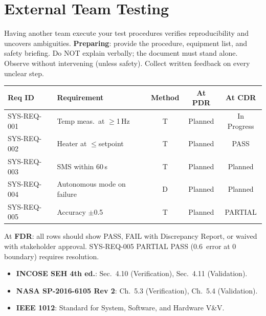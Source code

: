 \section{External Team Testing}
Having another team execute your test procedures verifies reproducibility and uncovers ambiguities. \textbf{Preparing}: provide the procedure, equipment list, and safety briefing. Do NOT explain verbally; the document must stand alone. Observe without intervening (unless safety). Collect written feedback on every unclear step.

\begin{greenshieldbox}
\small
\begin{tabularx}{\linewidth}{l l c c c}
\toprule
\textbf{Req ID} & \textbf{Requirement} & \textbf{Method} & \textbf{At PDR} & \textbf{At CDR} \\
\midrule
SYS-REQ-001 & Temp meas.\ at $\geq$1\,Hz & T & Planned & In Progress \\
SYS-REQ-002 & Heater at $\leq$setpoint & T & Planned & PASS \\
SYS-REQ-003 & SMS within 60\,s & T & Planned & Planned \\
SYS-REQ-004 & Autonomous mode on failure & D & Planned & Planned \\
SYS-REQ-005 & Accuracy $\pm$0.5\,\degC{} & T & Planned & PARTIAL \\
\bottomrule
\end{tabularx}

At \textbf{FDR}: all rows should show PASS, FAIL with Discrepancy Report, or waived with stakeholder approval. SYS-REQ-005 PARTIAL PASS (0.6\,\degC{} error at 0\,\degC{} boundary) requires resolution.
\end{greenshieldbox}

\begin{keyconceptbox}
\begin{itemize}[nosep,leftmargin=1.5em]
\item \textbf{INCOSE SEH 4th ed.}: Sec.\ 4.10 (Verification), Sec.\ 4.11 (Validation).
\item \textbf{NASA SP-2016-6105 Rev 2}: Ch.\ 5.3 (Verification), Ch.\ 5.4 (Validation).
\item \textbf{IEEE 1012}: Standard for System, Software, and Hardware V\&V.
\end{itemize}
\end{keyconceptbox}

